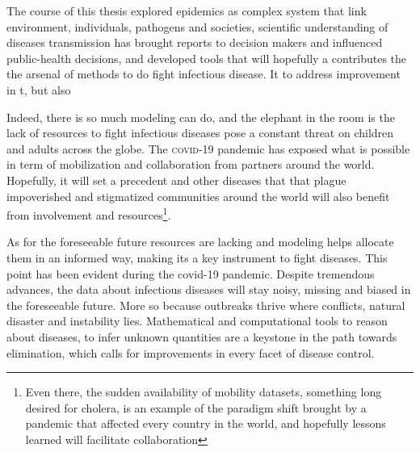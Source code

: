 The course of this thesis explored epidemics as complex system that link environment, individuals, pathogens and societies,  scientific understanding of diseases transmission has brought reports to decision makers and influenced public-health decisions, and developed tools that will hopefully a contributes the the arsenal of methods to do fight infectious disease. It  to address improvement in t, but also 

Indeed, there is so much modeling can do, and the elephant in the room is the lack of resources to fight infectious diseases pose a constant threat on children and adults across the globe. The \textsc{covid}-19 pandemic has exposed what is possible in term of mobilization and collaboration from partners around the world. Hopefully, it will set a precedent and other diseases that that plague impoverished and stigmatized communities around the world will also benefit from involvement and resources\footnote{Even there, the sudden availability of mobility datasets, something long desired for cholera, is an example of the paradigm shift brought by a pandemic that affected every country in the world, and hopefully lessons learned will facilitate collaboration}. 

As for the foreseeable future resources are lacking and modeling helps allocate them in an informed way, making its a key instrument to fight diseases. This point has been evident during the covid-19 pandemic. Despite tremendous advances, the data about infectious diseases will stay noisy, missing and biased in the foreseeable future. More so because outbreaks thrive where conflicts, natural disaster and instability lies. Mathematical and computational tools to reason about diseases, to infer unknown quantities are a keystone in the path towards elimination, which calls for improvements in every facet of disease control. 







